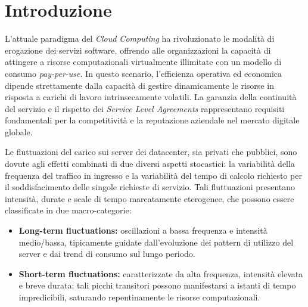 ﻿\documentclass[a4paper,12pt]{article}
\begin{document}
\clearpage

\pagestyle{indexpage}

\tableofcontents

\clearpage

\pagestyle{formalstyle}
\section{Introduzione}\label{sec:introduzione}

L'attuale paradigma del \textit{Cloud Computing} ha rivoluzionato le modalità di erogazione dei servizi software, offrendo alle organizzazioni la capacità di attingere a risorse computazionali virtualmente illimitate con un modello di consumo \textit{pay-per-use}. In questo scenario, l'efficienza operativa ed economica dipende strettamente dalla capacità di gestire dinamicamente le risorse in risposta a carichi di lavoro intrinsecamente volatili. La garanzia della continuità del servizio e il rispetto dei \textit{Service Level Agreements} rappresentano requisiti fondamentali per la competitività e la reputazione aziendale nel mercato digitale globale.

Le fluttuazioni del carico sui server dei datacenter, sia privati che pubblici, sono dovute agli effetti combinati di due diversi aspetti stocastici: la variabilità della frequenza del traffico in ingresso e la variabilità del tempo di calcolo richiesto per il soddisfacimento delle singole richieste di servizio. Tali fluttuazioni presentano intensità, durate e scale di tempo marcatamente eterogenee, che possono essere classificate in due macro-categorie:
\begin{itemize}
    \item \textbf{Long-term fluctuations:} oscillazioni a bassa frequenza e intensità medio/bassa, tipicamente guidate dall'evoluzione dei pattern di utilizzo del server e dai trend di consumo sul lungo periodo.
    \item \textbf{Short-term fluctuations:} caratterizzate da alta frequenza, intensità elevata e breve durata; tali picchi transitori possono manifestarsi a istanti di tempo impredicibili, saturando repentinamente le risorse computazionali.
\end{itemize}
\end{document}
